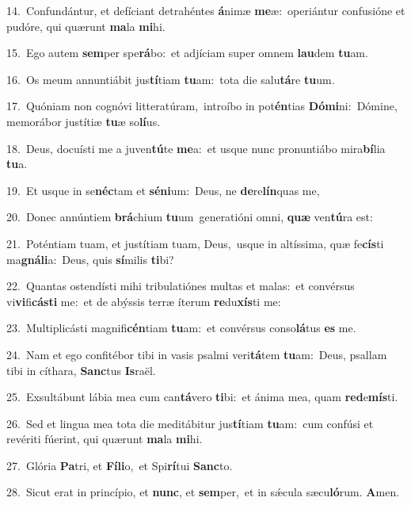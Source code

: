 {\numbfont\textcolor{\numbcolor}{14.}}~Confundántur, et defíciant detrahéntes \textbf{á}\-nimæ \textbf{me}\-æ:~\star operiántur confusióne et pudóre, qui quærunt \textbf{ma}\-la \textbf{mi}\-hi.\par
{\numbfont\textcolor{\numbcolor}{15.}}~Ego autem \textbf{sem}\-per spe\-\textbf{rá}\-bo:~\star et adjíciam super omnem \textbf{lau}\-dem \textbf{tu}\-am.\par
{\numbfont\textcolor{\numbcolor}{16.}}~Os meum annuntiábit jus\-\textbf{tí}\-tiam \textbf{tu}\-am:~\star tota die salu\-\textbf{tá}\-re \textbf{tu}\-um.\par
{\numbfont\textcolor{\numbcolor}{17.}}~Quóniam non cognóvi litteratúram,~\dagger introíbo in pot\-\textbf{én}\-tias \textbf{Dó}\-\textbf{mi}ni:~\star Dómine, memorábor justítiæ \textbf{tu}\-æ so\-\textbf{lí}\-us.\par
{\numbfont\textcolor{\numbcolor}{18.}}~Deus, docuísti me a juven\-\textbf{tú}\-te \textbf{me}\-a:~\star et usque nunc pronuntiábo mira\-\textbf{bí}\-lia \textbf{tu}\-a.\par
{\numbfont\textcolor{\numbcolor}{19.}}~Et usque in se\-\textbf{néc}\-tam et \textbf{sé}\-\textbf{ni}um:~\star Deus, ne \textbf{de}\-re\-\textbf{lín}\-quas me,\par
{\numbfont\textcolor{\numbcolor}{20.}}~Donec annúntiem \textbf{brá}\-chium \textbf{tu}\-um~\star generatióni omni, \textbf{quæ} ven\-\textbf{tú}\-ra est:\par
{\numbfont\textcolor{\numbcolor}{21.}}~Poténtiam tuam, et justítiam tuam, Deus,~\dagger usque in altíssima, quæ fe\-\textbf{cís}\-ti ma\-\textbf{gná}\-\textbf{li}a:~\star Deus, quis \textbf{sí}\-milis \textbf{ti}\-bi?\par
{\numbfont\textcolor{\numbcolor}{22.}}~Quantas ostendísti mihi tribulatiónes multas et malas:~\dagger et convérsus vi\-\textbf{vi}\-fi\-\textbf{cás}\-\textbf{ti} me:~\star et de abýssis terræ íterum \textbf{re}\-du\-\textbf{xís}\-ti me:\par
{\numbfont\textcolor{\numbcolor}{23.}}~Multiplicásti magnifi\-\textbf{cén}\-tiam \textbf{tu}\-am:~\star et convérsus conso\-\textbf{lá}\-tus \textbf{es} me.\par
{\numbfont\textcolor{\numbcolor}{24.}}~Nam et ego confitébor tibi in vasis psalmi veri\-\textbf{tá}\-tem \textbf{tu}\-am:~\star Deus, psallam tibi in cíthara, \textbf{Sanc}\-tus \textbf{Is}\-raël.\par
{\numbfont\textcolor{\numbcolor}{25.}}~Exsultábunt lábia mea cum can\-\textbf{tá}\-vero \textbf{ti}\-bi:~\star et ánima mea, quam \textbf{red}\-e\-\textbf{mís}\-ti.\par
{\numbfont\textcolor{\numbcolor}{26.}}~Sed et lingua mea tota die meditábitur jus\-\textbf{tí}\-tiam \textbf{tu}\-am:~\star cum confúsi et revériti fúerint, qui quærunt \textbf{ma}\-la \textbf{mi}\-hi.\par
{\numbfont\textcolor{\numbcolor}{27.}}~Glória \textbf{Pa}\-tri, et \textbf{Fí}\-\textbf{li}o,~\star et Spi\-\textbf{rí}\-tui \textbf{Sanc}\-to.\par
{\numbfont\textcolor{\numbcolor}{28.}}~Sicut erat in princípio, et \textbf{nunc}\-, et \textbf{sem}\-per,~\star et in sǽcula sæcu\-\textbf{ló}\-rum. \textbf{A}\-men.\par
